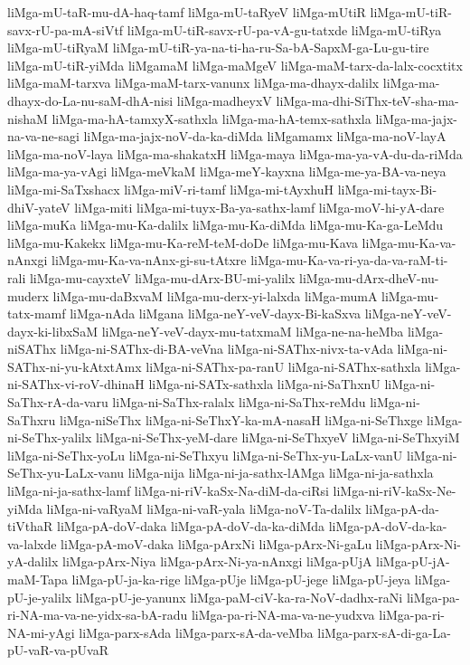 {liMga-mU-taR-mu-dA-haq-tamf
liMga-mU-taRyeV
liMga-mUtiR
liMga-mU-tiR-savx-rU-pa-mA-siVtf
liMga-mU-tiR-savx-rU-pa-vA-gu-tatxde
liMga-mU-tiRya
liMga-mU-tiRyaM
liMga-mU-tiR-ya-na-ti-ha-ru-Sa-bA-SapxM-ga-Lu-gu-tire
liMga-mU-tiR-yiMda
liMgamaM
liMga-maMgeV
liMga-maM-tarx-da-lalx-cocxtitx
liMga-maM-tarxva
liMga-maM-tarx-vanunx
liMga-ma-dhayx-dalilx
liMga-ma-dhayx-do-La-nu-saM-dhA-nisi
liMga-madheyxV
liMga-ma-dhi-SiThx-teV-sha-ma-nishaM
liMga-ma-hA-tamxyX-sathxla
liMga-ma-hA-temx-sathxla
liMga-ma-jajx-na-va-ne-sagi
liMga-ma-jajx-noV-da-ka-diMda
liMgamamx
liMga-ma-noV-layA
liMga-ma-noV-laya
liMga-ma-shakatxH
liMga-maya
liMga-ma-ya-vA-du-da-riMda
liMga-ma-ya-vAgi
liMga-meVkaM
liMga-meY-kayxna
liMga-me-ya-BA-va-neya
liMga-mi-SaTxshacx
liMga-miV-ri-tamf
liMga-mi-tAyxhuH
liMga-mi-tayx-Bi-dhiV-yateV
liMga-miti
liMga-mi-tuyx-Ba-ya-sathx-lamf
liMga-moV-hi-yA-dare
liMga-muKa
liMga-mu-Ka-dalilx
liMga-mu-Ka-diMda
liMga-mu-Ka-ga-LeMdu
liMga-mu-Kakekx
liMga-mu-Ka-reM-teM-doDe
liMga-mu-Kava
liMga-mu-Ka-va-nAnxgi
liMga-mu-Ka-va-nAnx-gi-su-tAtxre
liMga-mu-Ka-va-ri-ya-da-va-raM-ti-rali
liMga-mu-cayxteV
liMga-mu-dArx-BU-mi-yalilx
liMga-mu-dArx-dheV-nu-muderx
liMga-mu-daBxvaM
liMga-mu-derx-yi-lalxda
liMga-mumA
liMga-mu-tatx-mamf
liMga-nAda
liMgana
liMga-neY-veV-dayx-Bi-kaSxva
liMga-neY-veV-dayx-ki-libxSaM
liMga-neY-veV-dayx-mu-tatxmaM
liMga-ne-na-heMba
liMga-niSAThx
liMga-ni-SAThx-di-BA-veVna
liMga-ni-SAThx-nivx-ta-vAda
liMga-ni-SAThx-ni-yu-kAtxtAmx
liMga-ni-SAThx-pa-ranU
liMga-ni-SAThx-sathxla
liMga-ni-SAThx-vi-roV-dhinaH
liMga-ni-SATx-sathxla
liMga-ni-SaThxnU
liMga-ni-SaThx-rA-da-varu
liMga-ni-SaThx-ralalx
liMga-ni-SaThx-reMdu
liMga-ni-SaThxru
liMga-niSeThx
liMga-ni-SeThxY-ka-mA-nasaH
liMga-ni-SeThxge
liMga-ni-SeThx-yalilx
liMga-ni-SeThx-yeM-dare
liMga-ni-SeThxyeV
liMga-ni-SeThxyiM
liMga-ni-SeThx-yoLu
liMga-ni-SeThxyu
liMga-ni-SeThx-yu-LaLx-vanU
liMga-ni-SeThx-yu-LaLx-vanu
liMga-nija
liMga-ni-ja-sathx-lAMga
liMga-ni-ja-sathxla
liMga-ni-ja-sathx-lamf
liMga-ni-riV-kaSx-Na-diM-da-ciRsi
liMga-ni-riV-kaSx-Ne-yiMda
liMga-ni-vaRyaM
liMga-ni-vaR-yala
liMga-noV-Ta-dalilx
liMga-pA-da-tiVthaR
liMga-pA-doV-daka
liMga-pA-doV-da-ka-diMda
liMga-pA-doV-da-ka-va-lalxde
liMga-pA-moV-daka
liMga-pArxNi
liMga-pArx-Ni-gaLu
liMga-pArx-Ni-yA-dalilx
liMga-pArx-Niya
liMga-pArx-Ni-ya-nAnxgi
liMga-pUjA
liMga-pU-jA-maM-Tapa
liMga-pU-ja-ka-rige
liMga-pUje
liMga-pU-jege
liMga-pU-jeya
liMga-pU-je-yalilx
liMga-pU-je-yanunx
liMga-paM-ciV-ka-ra-NoV-dadhx-raNi
liMga-pa-ri-NA-ma-va-ne-yidx-sa-bA-radu
liMga-pa-ri-NA-ma-va-ne-yudxva
liMga-pa-ri-NA-mi-yAgi
liMga-parx-sAda
liMga-parx-sA-da-veMba
liMga-parx-sA-di-ga-La-pU-vaR-va-pUvaR
}
